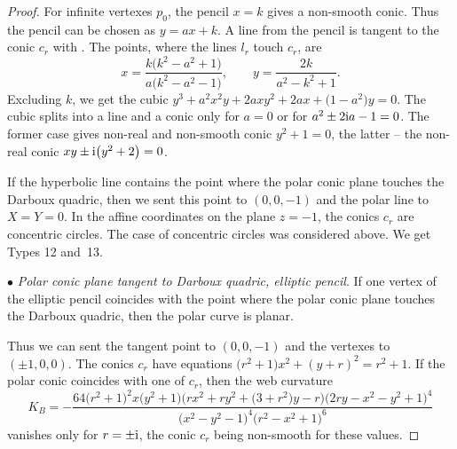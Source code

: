\begin{proof}
For infinite vertexes $p_0$, the pencil $x=k$ gives a non-smooth conic. Thus the pencil can be chosen as $y=ax+k$. A line from the pencil is tangent to the conic $c_r$ with
.
 The points, where the lines $l_r$ touch $c_r$, are
\[
x=\frac{k\bigl(k^2 -a^2+1\bigr)}{a\bigl(k^2-a^2-1\bigr)}, \qquad y=\frac{2k}{a^2 - k^2 + 1}.
\]
Excluding $k$, we get the cubic
$
y^3+a^2x^2y+2axy^2+2ax+\bigl(1-a^2\bigr)y=0$.
The cubic splits into a line and a conic only for $a=0$ or for $a^2 \pm 2{\rm i}a -1=0$. The former case gives non-real and non-smooth conic $y^2+1=0$, the latter -- the non-real conic $xy \pm {\rm i} \bigl(y^2+2\bigr)=0$.

 If the hyperbolic line contains the point where the polar conic plane touches the Darboux quadric, then we sent this point to $(0,0,-1)$ and the polar line to $X=Y=0$. In the affine coordinates on the plane $z=-1$, the conics $c_r$ are concentric circles. The case of concentric circles was considered above. We get Types 12 and~13.


$\bullet$ {\it Polar conic plane tangent to Darboux quadric, elliptic pencil}.
If one vertex of the elliptic pencil coincides with the point where the polar conic plane touches the Darboux quadric, then the polar curve is planar.

Thus we can sent the tangent point to $(0,0,-1)$ and the vertexes to $(\pm 1,0,0)$. The conics $c_r$ have equations
$
\bigl(r^2 + 1\bigr)x^2 + (y+r)^2 = r^2+1$.
If the polar conic coincides with one of $c_r$, then the web curvature
\[
K_B=-\frac{64\bigl(r^2 + 1\bigr)^2x\bigl(y^2 + 1\bigr)\bigl( rx^2 + ry^2+ \bigl(3+r^2\bigr)y - r \bigr)\bigl(2ry - x^2 - y^2 + 1\bigr)^4}{\bigl(x^2 - y^2 - 1\bigr)^4\bigl(r^2 - x^2 + 1\bigr)^6}
\]
vanishes only for $r=\pm {\rm i}$, the conic $c_r$ being non-smooth for these values.


\end{proof}
